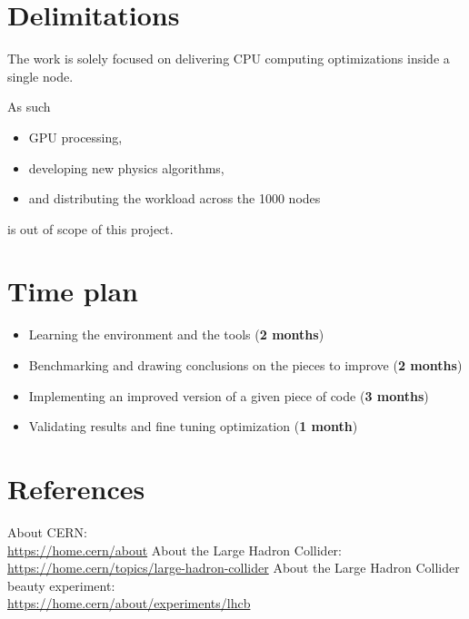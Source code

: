 \documentclass[12pt]{article}
\begin{document}

	
	
	
	\section{Delimitations}

	\color{blue}
	The work is solely focused on delivering CPU computing optimizations inside a single node. 
	
	As such
	\begin{itemize}
		\item GPU processing,
		\item developing new physics algorithms,
		\item and distributing the workload across the 1000 nodes
	\end{itemize}
	is out of scope of this project.
	\color{black}


	\section{Time plan}
		
	\begin{itemize}
		\item Learning the environment and the tools (\textbf{2 months})
		\item Benchmarking and drawing conclusions on the pieces to improve (\textbf{2 months})
		\item Implementing an improved version of a given piece of code (\textbf{3 months})
		\item Validating results and fine tuning optimization (\textbf{1 month})
	\end{itemize}

	
	\section{References}
	
	\begin{thebibliography}{asd}
		 About CERN: \\
			\url{https://home.cern/about}
		 About the Large Hadron Collider: \\
			\url{https://home.cern/topics/large-hadron-collider}
		 About the Large Hadron Collider beauty experiment: \\
			\url{https://home.cern/about/experiments/lhcb}
	\end{thebibliography}
\end{document}
